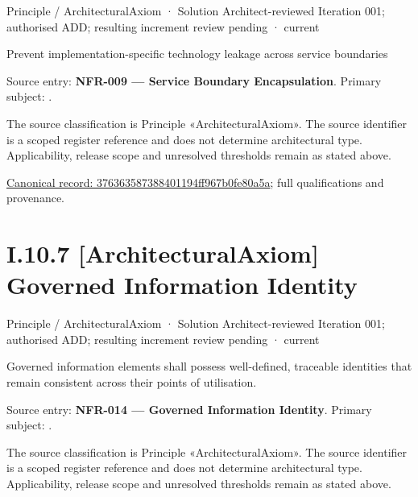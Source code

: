 \label{element:376363587388401194ff967b0fe80a5a}
{\small Principle / ArchitecturalAxiom · Solution Architect-reviewed Iteration 001; authorised ADD; resulting increment review pending · current}\par

Prevent implementation-specific technology leakage across service boundaries



Source entry: \textbf{NFR-009 — Service Boundary Encapsulation}. Primary subject: \texttt{}.



The source classification is Principle «ArchitecturalAxiom». The source identifier is a scoped register reference and does not determine architectural type. Applicability, release scope and unresolved thresholds remain as stated above.


{\footnotesize \href{../../../../../../../../continuum/motivation/principle/architectural-axiom/376363587388401194ff967b0fe80a5a.md}{Canonical record: 376363587388401194ff967b0fe80a5a}; full qualifications and provenance.}\par
\section*{I.10.7 [ArchitecturalAxiom] Governed Information Identity}
\label{navigation:I.10.7}

\label{element:c2e7ee7597e64275b3523befd72c0987}
{\small Principle / ArchitecturalAxiom · Solution Architect-reviewed Iteration 001; authorised ADD; resulting increment review pending · current}\par

Governed information elements shall possess well-defined, traceable identities that remain consistent across their points of utilisation.



Source entry: \textbf{NFR-014 — Governed Information Identity}. Primary subject: \texttt{}.



The source classification is Principle «ArchitecturalAxiom». The source identifier is a scoped register reference and does not determine architectural type. Applicability, release scope and unresolved thresholds remain as stated above.


